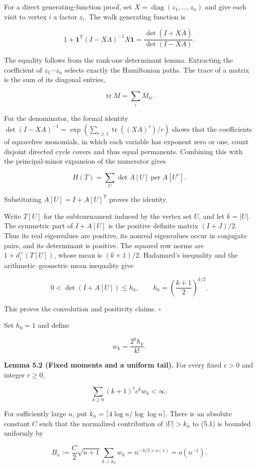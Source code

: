 \documentclass[11pt,a4paper]{article}
\begin{document}
For a direct generating-function proof, set \(X=\operatorname{diag}(z_1,\ldots,z_n)\) and give each visit to vertex \(i\) a factor \(z_i\). The walk generating function is

\[
1+\mathbf1^{\mathsf T}(I-XA)^{-1}X\mathbf1
=\frac{\det(I+X\overline A)}{\det(I-XA)}.
\]

The equality follows from the rank-one determinant lemma. Extracting the coefficient of \(z_1\cdots z_n\) selects exactly the Hamiltonian paths. The trace of a matrix is the sum of its diagonal entries,

\[
\operatorname{tr}M=\sum_iM_{ii}.
\]

For the denominator, the formal identity \(\det(I-XA)^{-1}=\exp(\sum_{r\ge1}\operatorname{tr}((XA)^r)/r)\) shows that the coefficients of squarefree monomials, in which each variable has exponent zero or one, count disjoint directed cycle covers and thus equal permanents. Combining this with the principal-minor expansion of the numerator gives

\[
H(T)=\sum_U\det\overline A[U]\operatorname{per}A[U^c].
\]

Substituting \(\overline A[U]=I+A[U]^{\mathsf T}\) proves the identity.

Write \(T[U]\) for the subtournament induced by the vertex set \(U\), and let \(k=|U|\). The symmetric part of \(I+A[U]\) is the positive definite matrix \((I+J)/2\). Thus its real eigenvalues are positive, its nonreal eigenvalues occur in conjugate pairs, and its determinant is positive. The squared row norms are \(1+d_i^+(T[U])\), whose mean is \((k+1)/2\). Hadamard's inequality and the arithmetic--geometric mean inequality give

\[
0<\det(I+A[U])\le h_k,\qquad h_k=\left(\frac{k+1}{2}\right)^{k/2}.
\]

This proves the convolution and positivity claims. \(\square\)

Set \(h_0=1\) and define

\[
w_k=\frac{2^k h_k}{k!}.
\]

\textbf{Lemma 5.2 (Fixed moments and a uniform tail).} For every fixed \(c>0\) and integer \(r\ge0\),

\[
\sum_{k\ge0}(k+1)^r c^kw_k<\infty.
\]

For sufficiently large \(n\), put \(k_n=\lceil4\log n/\log\log n\rceil\). There is an absolute constant \(C\) such that the normalized contribution of \(|U|>k_n\) to (5.1) is bounded uniformly by

\[
B_n:=\frac C2\sqrt{n+1}\sum_{k>k_n}w_k
=n^{-3/2+o(1)}=o(n^{-1}).
\]
\end{document}
